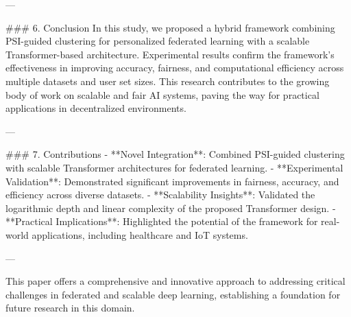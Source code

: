 ---

### 6. Conclusion  
In this study, we proposed a hybrid framework combining PSI-guided clustering for personalized federated learning with a scalable Transformer-based architecture. Experimental results confirm the framework's effectiveness in improving accuracy, fairness, and computational efficiency across multiple datasets and user set sizes. This research contributes to the growing body of work on scalable and fair AI systems, paving the way for practical applications in decentralized environments.

---

### 7. Contributions  
- **Novel Integration**: Combined PSI-guided clustering with scalable Transformer architectures for federated learning.  
- **Experimental Validation**: Demonstrated significant improvements in fairness, accuracy, and efficiency across diverse datasets.  
- **Scalability Insights**: Validated the logarithmic depth and linear complexity of the proposed Transformer design.  
- **Practical Implications**: Highlighted the potential of the framework for real-world applications, including healthcare and IoT systems.  

--- 

This paper offers a comprehensive and innovative approach to addressing critical challenges in federated and scalable deep learning, establishing a foundation for future research in this domain.